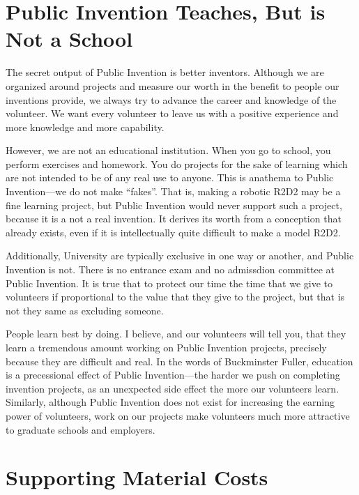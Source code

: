 \documentclass[
	fontsize=10pt, %
	twoside=false, %
	secnumdepth=1, %
]{kaobook}
\begin{document}
\section{Public Invention Teaches, But is Not a School}

The secret output of Public Invention is better inventors.
Although we are organized around projects and
measure our worth in the benefit to people our inventions provide,
we always try to advance the career and knowledge of the volunteer.
We want every volunteer to leave us with a positive experience
and more knowledge and more capability.

However, we are not an educational institution.
When you go to school, you perform exercises and homework.
You do projects for the sake of learning which are not
intended to be of any real use to anyone.
This is anathema to Public Invention---we do not make ``fakes''.
That is, making a robotic R2D2 may be a fine learning
project, but Public Invention would never support such
a project, because it is a not a real invention.
It derives its worth from a conception that already exists,
even if it is intellectually quite difficult to make a model R2D2.

Additionally, University are typically exclusive in one way
or another, and Public Invention is not.
There is no entrance exam and no admissdion committee at Public Invention.
It is true that to protect our time the time that we give
to volunteers if proportional to the value that they give to the project,
but that is not they same as excluding someone.

People learn best by doing. I believe, and our volunteers
will tell you, that they learn a tremendous amount working
on Public Invention projects, precisely because they are difficult and real.
In the words of Buckminster Fuller, education is a precessional effect
of Public Invention---the harder we push on completing invention projects,
as an unexpected side effect the more our volunteers learn.
Similarly, although Public Invention does not exist for increasing the
earning power of volunteers, work on our projects make volunteers much more
attractive to graduate schools and employers.

\section{Supporting Material Costs}
\label{chp:material}
\end{document}
